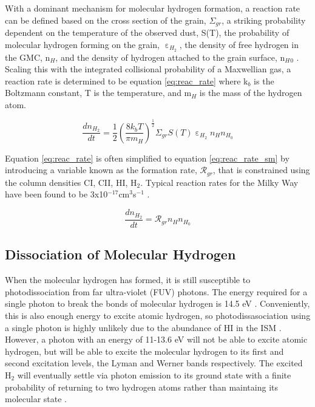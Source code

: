 
With a dominant mechanism for molecular hydrogen formation, a reaction rate can be defined based on the cross section of the grain, $\Sigma_{gr}$, a striking probability dependent on the temperature of the observed dust, S(T), the probability of molecular hydrogen forming on the grain, $\upepsilon_{H_2}$, the density of free hydrogen in the GMC, n$_H$, and the density of hydrogen attached to the grain surface, n$_H{_0}$ \citep{krumholz2014}.  Scaling this with the integrated collisional probability of a Maxwellian gas, a reaction rate is determined to be equation \ref{eq:reac_rate} where k$_b$ is the Boltzmann constant, T is the temperature, and m$_H$ is the mass of the hydrogen atom.

\begin{equation}\label{eq:reac_rate}
  \frac{dn_{H_2}}{dt} = \frac{1}{2}\left(\frac{8k_bT}{\pi m_H}\right)^\frac{1}{2}\Sigma_{gr}S\left(T\right)\upepsilon_{H_2}n_{H}n_{H_0}
\end{equation}

Equation \ref{eq:reac_rate} is often simplified to equation \ref{eq:reac_rate_sm} by introducing a variable known as the formation rate, $\mathcal{R}_{gr}$, that is constrained using the column densities CI, CII, HI, H$_2$.  Typical reaction rates for the Milky Way have been found to be 3x10$^{-17}$cm$^3$s$^{-1}$ \citep{jura1975, gry2002, wolfire2008}.

\begin{equation}\label{eq:reac_rate_sm}
  \frac{dn_{H_2}}{dt} = \mathcal{R}_{gr}n_H n_{H_0}
\end{equation}

\subsection{Dissociation of Molecular Hydrogen}\label{h2destroy}

When the molecular hydrogen has formed, it is still susceptible to photodissociation from far ultra-violet (FUV) photons.  The energy required for a single photon to break the bonds of molecular hydrogen is 14.5 eV \citep{krumholz2014}.  Conveniently, this is also enough energy to excite atomic hydrogen, so photodissasociation using a single photon is highly unlikely due to the abundance of HI in the ISM \citep{krumholz2014}.  However, a photon with an energy of 11-13.6 eV will not be able to excite atomic hydrogen, but will be able to excite the molecular hydrogen to its first and second excitation levels, the Lyman and Werner bands respectively.  The excited H$_2$ will eventually settle via photon emission to its ground state with a finite probability of returning to two hydrogen atoms rather than maintaing its molecular state \citep{krumholz2014}.

